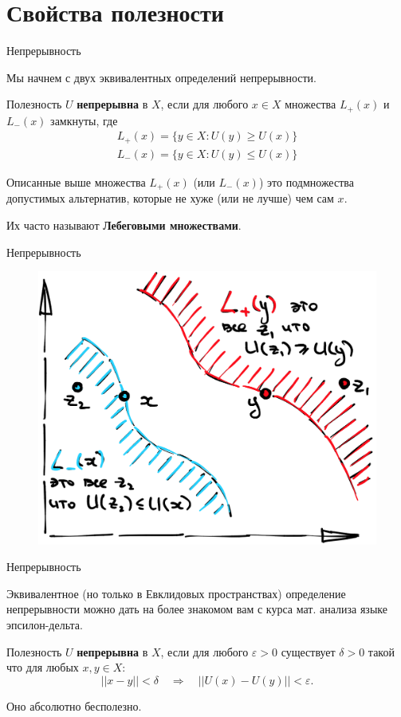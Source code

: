 \documentclass{beamer}
\begin{document}
\section{Свойства полезности}

\begin{frame}{Непрерывность}

Мы начнем с двух эквивалентных определений непрерывности.

\begin{definition}
Полезность $U$ \textbf{непрерывна} в $X$, если для любого $x \in X$ множества $L_{+}(x)$ и $L_{-}(x)$ замкнуты, где
\begin{gather*} L_{+}(x) = \{y \in X: U(y) \geqslant U(x)\}\\
 L_{-}(x) = \{y \in X: U(y) \leqslant U(x)\}\end{gather*}
\end{definition}

Описанные выше множества $L_{+}(x)$ (или $L_{-}(x)$) это подмножества допустимых альтернатив, которые не хуже (или не лучше) чем сам $x$. 

Их часто называют \textbf{Лебеговыми множествами}.

\end{frame}

\begin{frame}{Непрерывность}

\begin{figure}[hbt]
\centering
\includegraphics[width=.8 \textwidth]{lebeg_sets.png}
\end{figure}

\end{frame}

\begin{frame}{Непрерывность}

Эквивалентное (но только в Евклидовых пространствах) определение непрерывности можно дать на более знакомом вам с курса мат. анализа языке эпсилон-дельта.

\begin{definition} Полезность $U$ \textbf{непрерывна} в $X$, если для любого $\varepsilon > 0$ существует $\delta >0$ такой что для любых $x, y \in X$: $$ ||x - y|| < \delta \quad \Rightarrow \quad ||U(x) - U(y)|| < \varepsilon.$$	
\end{definition}

Оно абсолютно бесполезно.

\end{frame}
\end{document}
